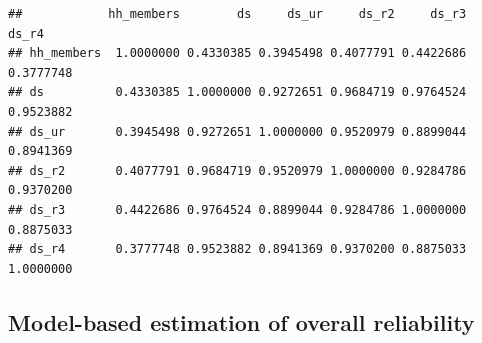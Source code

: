 \documentclass[]{book}
\newenvironment{Shaded}{\begin{snugshade}}{\end{snugshade}}
\newcommand{\DecValTok}[1]{\textcolor[rgb]{0.00,0.00,0.81}{#1}}
\newcommand{\KeywordTok}[1]{\textcolor[rgb]{0.13,0.29,0.53}{\textbf{#1}}}
\newcommand{\NormalTok}[1]{#1}
\newcommand{\OperatorTok}[1]{\textcolor[rgb]{0.81,0.36,0.00}{\textbf{#1}}}
\begin{document}
\begin{Shaded}
\end{Shaded}

\begin{verbatim}
##            hh_members        ds     ds_ur     ds_r2     ds_r3     ds_r4
## hh_members  1.0000000 0.4330385 0.3945498 0.4077791 0.4422686 0.3777748
## ds          0.4330385 1.0000000 0.9272651 0.9684719 0.9764524 0.9523882
## ds_ur       0.3945498 0.9272651 1.0000000 0.9520979 0.8899044 0.8941369
## ds_r2       0.4077791 0.9684719 0.9520979 1.0000000 0.9284786 0.9370200
## ds_r3       0.4422686 0.9764524 0.8899044 0.9284786 1.0000000 0.8875033
## ds_r4       0.3777748 0.9523882 0.8941369 0.9370200 0.8875033 1.0000000
\end{verbatim}

\hypertarget{model-based-estimation-of-overall-reliability}{%
\subsection{Model-based estimation of overall reliability}\label{model-based-estimation-of-overall-reliability}}
\end{document}
